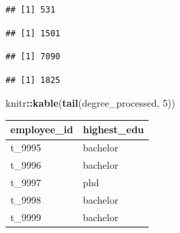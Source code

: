 \documentclass[11pt,]{article}
\newenvironment{Shaded}{\begin{snugshade}}{\end{snugshade}}
\newcommand{\AttributeTok}[1]{\textcolor[rgb]{0.13,0.29,0.53}{#1}}
\newcommand{\ConstantTok}[1]{\textcolor[rgb]{0.56,0.35,0.01}{#1}}
\newcommand{\DecValTok}[1]{\textcolor[rgb]{0.00,0.00,0.81}{#1}}
\newcommand{\FunctionTok}[1]{\textcolor[rgb]{0.13,0.29,0.53}{\textbf{#1}}}
\newcommand{\NormalTok}[1]{#1}
\newcommand{\SpecialCharTok}[1]{\textcolor[rgb]{0.81,0.36,0.00}{\textbf{#1}}}
\newcommand{\StringTok}[1]{\textcolor[rgb]{0.31,0.60,0.02}{#1}}
\begin{document}
\begin{verbatim}
## [1] 531
\end{verbatim}

\begin{Shaded}
\end{Shaded}

\begin{verbatim}
## [1] 1501
\end{verbatim}

\begin{Shaded}
\end{Shaded}

\begin{verbatim}
## [1] 7090
\end{verbatim}

\begin{Shaded}
\end{Shaded}

\begin{verbatim}
## [1] 1825
\end{verbatim}

\begin{Shaded}
\begin{Highlighting}[]
\NormalTok{knitr}\SpecialCharTok{::}\FunctionTok{kable}\NormalTok{(}\FunctionTok{tail}\NormalTok{(degree\_processed, }\DecValTok{5}\NormalTok{))}
\end{Highlighting}
\end{Shaded}

\begin{tabular}{l|l}
\hline
employee\_id & highest\_edu\\
\hline
t\_9995 & bachelor\\
\hline
t\_9996 & bachelor\\
\hline
t\_9997 & phd\\
\hline
t\_9998 & bachelor\\
\hline
t\_9999 & bachelor\\
\hline
\end{tabular}
\end{document}

